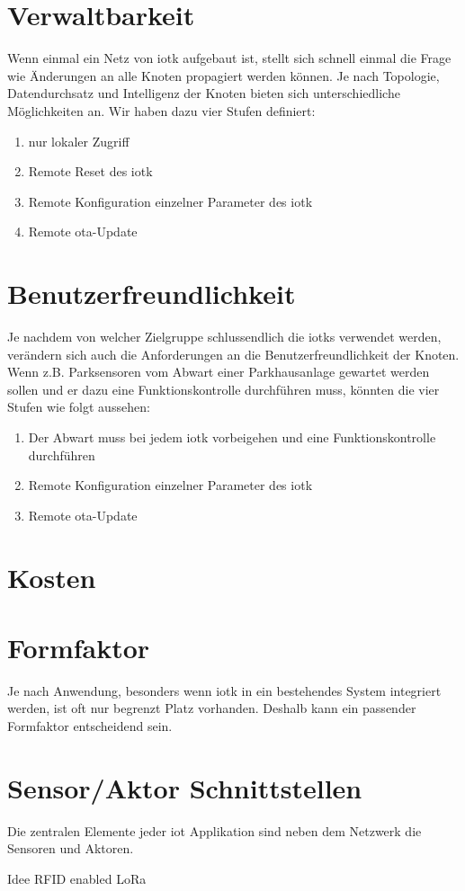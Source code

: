 \section{Verwaltbarkeit}

Wenn einmal ein Netz von \gls{iotk} aufgebaut ist, stellt sich schnell einmal die Frage wie Änderungen an alle Knoten propagiert werden können. Je nach Topologie, Datendurchsatz und Intelligenz der Knoten bieten sich unterschiedliche Möglichkeiten an. Wir haben dazu vier Stufen definiert:

\begin{enumerate}
  \item nur lokaler Zugriff
  \item Remote Reset des \gls{iotk}
  \item Remote Konfiguration einzelner Parameter des \gls{iotk}
  \item Remote \acrfull{ota}-Update 
\end{enumerate}

\section{Benutzerfreundlichkeit}

Je nachdem von welcher Zielgruppe schlussendlich die \glspl{iotk} verwendet werden, verändern sich auch die Anforderungen an die Benutzerfreundlichkeit der Knoten. Wenn z.B. Parksensoren vom Abwart einer Parkhausanlage gewartet werden sollen und er dazu eine Funktionskontrolle durchführen muss, könnten die vier Stufen wie folgt aussehen: 

\begin{enumerate}  
  \item Der Abwart muss bei jedem \gls{iotk} vorbeigehen und eine Funktionskontrolle durchführen
  \item Remote Konfiguration einzelner Parameter des \gls{iotk}
  \item Remote \acrfull{ota}-Update 
\end{enumerate}

\section{Kosten}


\section{Formfaktor}

Je nach Anwendung, besonders wenn \gls{iotk} in ein bestehendes System integriert werden, ist oft nur begrenzt Platz vorhanden. Deshalb kann ein passender Formfaktor entscheidend sein.

\section{Sensor/Aktor Schnittstellen}

Die zentralen Elemente jeder \gls{iot} Applikation sind neben dem Netzwerk die Sensoren und Aktoren. 

Idee RFID enabled LoRa
